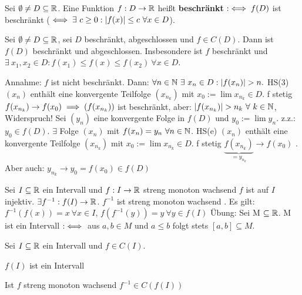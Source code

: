 \documentclass[a4paper,oneside,DIV15,BCOR12mm]{scrbook}
\begin{document}
\begin{definition*}
Sei $\emptyset \ne D \subseteq \mathbb{R}$. Eine Funktion $f: D\to\mathbb{R}$ heißt \textbf{beschränkt} $:\iff f(D)$ ist beschränkt ($\iff \exists\ c \ge 0 : |f(x)| \le c\ \forall x \in D$).
\end{definition*}

\begin{satz}
Sei $\emptyset \ne D \subseteq \mathbb{R}$, sei $D$ beschränkt, abgeschlossen und $f \in C(D)$. Dann ist $f(D)$ beschränkt und abgeschlossen. Insbesondere ist $f$ beschränkt und $\exists\ x_1, x_2 \in D : f(x_1) \le f(x) \le f(x_2)\ \forall x \in D$.
\end{satz}

\begin{beweis}
Annahme: $f$ ist nicht beschränkt. Dann: $\forall n \in \mathbb{N}\ \exists\ x_n \in D: |f(x_n)| > n.$ HS(3) \folgt $(x_n)$ enthält eine konvergente Teilfolge $(x_{n_k})$ mit $x_0:=\lim x_{n_k} \in D$. f stetig \folgt $f(x_{n_k}) \to f(x_0) \implies (f(x_{n_k}))$ ist beschränkt, aber: $|f(x_{n_k})| > n_k\ \forall\ k \in \mathbb{N}$, Widerspruch! Sei $(y_n)$ eine konvergente Folge in $f(D)$ und $y_0:=\lim y_n$. z.z.: $y_0 \in f(D)$. $\exists$ Folge $(x_n)$ mit $f(x_n)=y_n\ \forall n \in \mathbb{N}$. HS(e) \folgt $(x_n)$ enthält eine konvergente Teilfolge $(x_{n_k})$ mit $x_0:=\lim x_{n_k} \in D$. f stetig \folgt $\underbrace{f(x_{n_k})}_{=y_{n_k}} \to f(x_0)$ . Aber auch: $y_{n_k} \to y_0 = f(x_0) \in f(D)$
\end{beweis}

Sei $I \subseteq \mathbb{R}$ ein Intervall und $f: I \to \mathbb{R}$ streng monoton wachsend  \folgt $f$ ist auf $I$ injektiv. \folgt $\exists f^{-1}: f(I) \to \mathbb{R}$. $f^{-1}$ ist streng monoton wachsend . Es gilt: $f^{-1}(f(x)) = x\ \forall x \in I$, $f(f^{-1}(y)) = y\ \forall y \in f(I)$ Übung: Sei M $\subseteq \mathbb{R}$. M ist ein Intervall $:\iff$ aus $a, b \in M$ und $a \le b$ folgt stets $[a, b] \subseteq M$.

\begin{satz}
Sei $I \subseteq \mathbb{R}$ ein Intervall und $f \in C(I)$.
\begin{liste}
\item $f(I)$ ist ein Intervall
\item Ist $f$ streng monoton wachsend  \folgt $f^{-1} \in C(f(I))$
\end{liste}
\end{satz}
\end{document}

